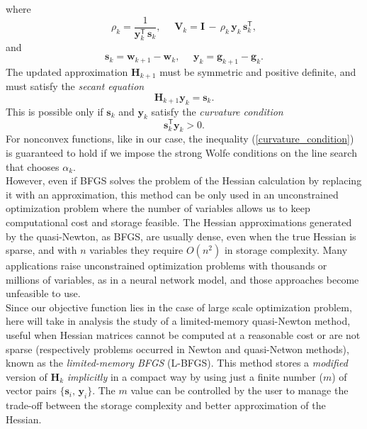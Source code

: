 where 
\begin{equation}
    \rho_k = \frac{1}{\mathbf{y}_k^\mathsf{T} \, \mathbf{s}_k}, \,\,\,\,\,\,\,\, \mathbf{V}_k = \mathbf{I} \, - \, \rho_k \, \mathbf{y}_k \, \mathbf{s}_k^\mathsf{T},
    \label{}
\end{equation}
and
\begin{equation}
    \mathbf{s}_k = \mathbf{w}_{k+1} - \mathbf{w}_k, \,\,\,\,\,\,\,\, \mathbf{y}_k = \mathbf{g}_{k+1} - \mathbf{g}_k.
    \label{}
\end{equation}
The updated approximation $\mathbf{H}_{k+1}$ must be symmetric and positive definite, and must satisfy the \emph{secant equation}
\begin{equation}
    \mathbf{H}_{k+1} \mathbf{y}_k = \mathbf{s}_k.
    \label{secant_equation}
\end{equation}
This is possible only if $\mathbf{s}_k$ and $\mathbf{y}_k$ satisfy the \emph{curvature condition}
\begin{equation}
    \mathbf{s}_k^\mathsf{T}\mathbf{y}_k > 0.
    \label{curvature_condition}
\end{equation}
For nonconvex functions, like in our case, the inequality (\ref{curvature_condition}) is guaranteed to hold if we impose the strong Wolfe conditions on the line search that chooses $\alpha_k$.\\

However, even if BFGS solves the problem of the Hessian calculation by replacing it with an approximation, this method can be only used in an unconstrained optimization problem where the number of variables allows us to keep computational cost and storage feasible. The Hessian approximations generated by the quasi-Newton, as BFGS, are usually dense, even when the true Hessian is sparse, and with $n$ variables they require $O(n^2)$ in storage complexity. Many applications raise unconstrained optimization problems with thousands or millions of variables, as in a neural network model, and those approaches become unfeasible to use.\\

Since our objective function lies in the case of large scale optimization problem, here will take in analysis the study of a limited-memory quasi-Newton method, useful when Hessian matrices cannot be computed at a reasonable cost or are not sparse (respectively problems occurred in Newton and quasi-Netwon methods), known as the \emph{limited-memory BFGS} (L-BFGS). This method stores a \emph{modified} version of $\mathbf{H}_k$ \emph{implicitly} in a compact way by using just a finite number ($m$) of vector pairs $\{ \mathbf{s}_i, \, \mathbf{y}_i\}$. The $m$ value can be controlled by the user to manage the trade-off between the storage complexity and better approximation of the Hessian.\\

